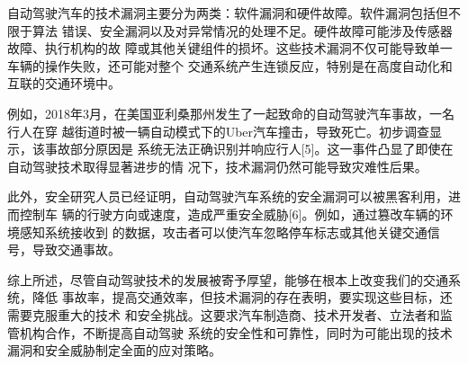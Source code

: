 自动驾驶汽车的技术漏洞主要分为两类：软件漏洞和硬件故障。软件漏洞包括但不限于算法
错误、安全漏洞以及对异常情况的处理不足。硬件故障可能涉及传感器故障、执行机构的故
障或其他关键组件的损坏。这些技术漏洞不仅可能导致单一车辆的操作失败，还可能对整个
交通系统产生连锁反应，特别是在高度自动化和互联的交通环境中。

例如，2018年3月，在美国亚利桑那州发生了一起致命的自动驾驶汽车事故，一名行人在穿
越街道时被一辆自动模式下的Uber汽车撞击，导致死亡。初步调查显示，该事故部分原因是
系统无法正确识别并响应行人[5]。这一事件凸显了即使在自动驾驶技术取得显著进步的情
况下，技术漏洞仍然可能导致灾难性后果。

此外，安全研究人员已经证明，自动驾驶汽车系统的安全漏洞可以被黑客利用，进而控制车
辆的行驶方向或速度，造成严重安全威胁[6]。例如，通过篡改车辆的环境感知系统接收到
的数据，攻击者可以使汽车忽略停车标志或其他关键交通信号，导致交通事故。

综上所述，尽管自动驾驶技术的发展被寄予厚望，能够在根本上改变我们的交通系统，降低
事故率，提高交通效率，但技术漏洞的存在表明，要实现这些目标，还需要克服重大的技术
和安全挑战。这要求汽车制造商、技术开发者、立法者和监管机构合作，不断提高自动驾驶
系统的安全性和可靠性，同时为可能出现的技术漏洞和安全威胁制定全面的应对策略。

